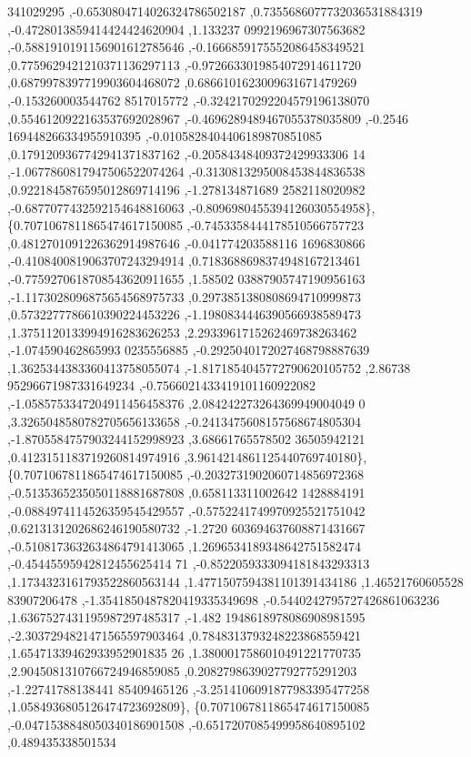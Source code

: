 \begin{DoxyCode}
      341029295 ,-0.6530804714026324786502187 ,0.7355686077732036531884319 ,-0.4728013859414424424620904 ,1.133237
      0992196967307563682 ,-0.5881910191156901612785646 ,-0.1666859175552086458349521 ,0.7759629421210371136297113
       ,-0.9726633019854072914611720 ,0.6879978397719903604468072 ,0.6866101623009631671479269 ,-0.153260003544762
      8517015772 ,-0.3242170292204579196138070 ,0.5546120922163537692028967 ,-0.4696289489467055378035809 ,-0.2546
      169448266334955910395 ,-0.0105828404406189870851085 ,0.1791209367742941371837162 ,-0.20584348409372429933306
      14 ,-1.0677860817947506522074264 ,-0.3130813295008453844836538 ,0.9221845876595012869714196 ,-1.278134871689
      2582118020982 ,-0.6877077432592154648816063 ,-0.8096980455394126030554958\},
\{0.7071067811865474617150085 ,-0.7453358444178510566757723 ,0.4812701091226362914987646 ,-0.041774203588116
      1696830866 ,-0.4108400819063707243294914 ,0.7183688698374948167213461 ,-0.7759270618708543620911655 ,1.58502
      03887905747190956163 ,-1.1173028096875654568975733 ,0.2973851380808694710999873 ,0.5732277786610390224453226
       ,-1.1980834446390566938589473 ,1.3751120133994916283626253 ,2.2933961715262469738263462 ,-1.074590462865993
      0235556885 ,-0.2925040172027468798887639 ,1.3625344383360413758055074 ,-1.8171854045772790620105752 ,2.86738
      95296671987331649234 ,-0.7566021433419101160922082 ,-1.0585753347204911456458376 ,2.084242273264369949004049
      0 ,3.3265048580782705656133658 ,-0.2413475608157568674805304 ,-1.8705584757903244152998923 ,3.68661765578502
      36505942121 ,0.4123151183719260814974916 ,3.9614214861125440769740180\},
\{0.7071067811865474617150085 ,-0.2032731902060714856972368 ,-0.5135365235050118881687808 ,0.658113311002642
      1428884191 ,-0.0884974114526359545429557 ,-0.5752241749970925521751042 ,0.6213131202686246190580732 ,-1.2720
      603694637608871431667 ,-0.5108173632634864791413065 ,1.2696534189348642751582474 ,-0.45445595942812455625414
      71 ,-0.8522059333094181843293313 ,1.1734323161793522860563144 ,1.4771507594381101391434186 ,1.46521760605528
      83907206478 ,-1.3541850487820419335349698 ,-0.5440242795727426861063236 ,1.6367527431195987297485317 ,-1.482
      1948618978086908981595 ,-2.3037294821471565597903464 ,0.7848313793248223868559421 ,1.65471339462933952901835
      26 ,1.3800017586010491221770735 ,2.9045081310766724946859085 ,0.2082798639027792775291203 ,-1.22741788138441
      85409465126 ,-3.2514106091877983395477258 ,1.0584936805126474723692809\},
\{0.7071067811865474617150085 ,-0.0471538848050340186901508 ,-0.6517207085499958640895102 ,0.489435338501534

\end{DoxyCode}
